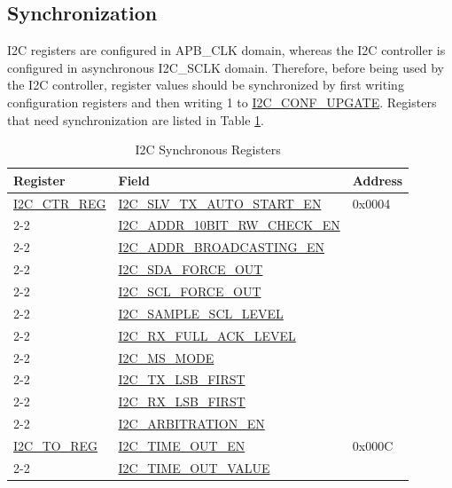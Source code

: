 \documentclass[main\_\_EN.tex]{subfiles}
\begin{document}
\subsection{Synchronization}
I2C registers are configured in APB\_CLK domain, whereas the I2C controller is configured in asynchronous I2C\_SCLK domain. Therefore, before being used by the I2C controller, register values should be synchronized by first writing configuration registers and then writing 1 to \hyperref[fielddesc:I2CCONFUPGATE]{I2C\_CONF\_UPGATE}. Registers that need synchronization are listed in Table \ref{tab:i2c-sync-register}. 

\clearpage
\begin{longtable}{ | p{6cm} | p{7cm} | p{2cm} | }
\caption{I2C Synchronous Registers}
\label{tab:i2c-sync-register}
\\\hline
\rowcolor{lightgray}
Register & Field & Address  \\ \hline

\hyperref[regdesc:I2CCTRREG]{I2C\_CTR\_REG} & {\hyperref[fielddesc:I2CSLVTXAUTOSTARTEN]{I2C\_SLV\_TX\_AUTO\_START\_EN}} & 0x0004  \\\cline{2-2}

& {\hyperref[fielddesc:I2CADDR10BITRWCHECKEN]{I2C\_ADDR\_10BIT\_RW\_CHECK\_EN}}& \\\cline{2-2}
& {\hyperref[fielddesc:I2CADDRBROADCASTINGEN]{I2C\_ADDR\_BROADCASTING\_EN}}& \\\cline{2-2}
& {\hyperref[fielddesc:I2CSDAFORCEOUT]{I2C\_SDA\_FORCE\_OUT}}& \\\cline{2-2}
& {\hyperref[fielddesc:I2CSCLFORCEOUT]{I2C\_SCL\_FORCE\_OUT}}& \\\cline{2-2}
& {\hyperref[fielddesc:I2CSAMPLESCLLEVEL]{I2C\_SAMPLE\_SCL\_LEVEL}}& \\\cline{2-2}
& {\hyperref[fielddesc:I2CRXFULLACKLEVEL]{I2C\_RX\_FULL\_ACK\_LEVEL}}& \\\cline{2-2}
& {\hyperref[fielddesc:I2CMSMODE]{I2C\_MS\_MODE}}& \\\cline{2-2}
& {\hyperref[fielddesc:I2CTXLSBFIRST]{I2C\_TX\_LSB\_FIRST}}& \\\cline{2-2}
& {\hyperref[fielddesc:I2CRXLSBFIRST]{I2C\_RX\_LSB\_FIRST}}& \\\cline{2-2}
& {\hyperref[fielddesc:I2CARBITRATIONEN]{I2C\_ARBITRATION\_EN}}& \\ \hline

\hyperref[regdesc:I2CTOREG]{I2C\_TO\_REG} & {\hyperref[fielddesc:I2CTIMEOUTEN]{I2C\_TIME\_OUT\_EN}} & 0x000C  \\\cline{2-2}
& {\hyperref[fielddesc:I2CTIMEOUTVALUE]{I2C\_TIME\_OUT\_VALUE}}& \\ \hline


\end{longtable}
\end{document}
